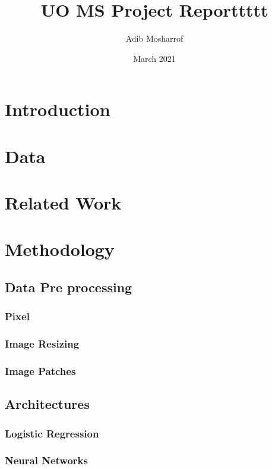 \documentclass{article}
\title{UO MS Project Reporttttt}
\author{Adib Mosharrof}
\date{March 2021}
\begin{document}
\maketitle

\tableofcontents
\newpage

\section{Introduction}

\section{Data}

\section{Related Work}
 
\section{Methodology}

\subsection{Data Pre processing}

\subsubsection{Pixel}

\subsubsection{Image Resizing}

\subsubsection{Image Patches}

\subsection{Architectures}
\subsubsection{Logistic Regression}
\subsubsection{Neural Networks}
\end{document}
